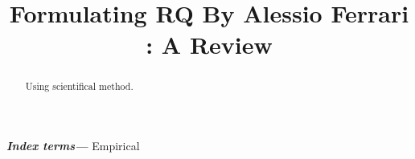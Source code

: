 \documentclass[conference, compsoc, twoside]{IEEEtran}
\begin{document}
\preto\tabular{\setcounter{magicrownumbers}{0}}
\newcommand\rownumber{\stepcounter{magicrownumbers}\arabic{magicrownumbers}}
\title{\Huge Formulating RQ By Alessio Ferrari : A Review}
\author{
}

\maketitle
\providecommand{\keywords}[1]{\textbf{\textit{Index terms---}} #1}
\begin{abstract}
Using scientifical method.
\end{abstract}

\keywords{Empirical}
\IEEEpeerreviewmaketitle
\end{document}
